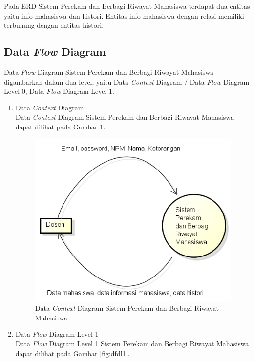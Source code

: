 Pada ERD Sistem Perekam dan Berbagi Riwayat Mahasiswa terdapat dua entitas yaitu info
mahasiswa dan histori. Entitas info mahasiswa dengan relasi memiliki terbuhung
dengan entitas histori.

\subsection{Data {\it Flow} Diagram}
Data {\it Flow} Diagram Sistem Perekam dan Berbagi Riwayat Mahasiswa digambarkan dalam dua
level, yaitu Data {\it Context} Diagram / Data {\it Flow} Diagram Level 0, Data
{\it Flow} Diagram Level 1.

\begin{enumerate}[(1)]
  \item Data {\it Context} Diagram\\
  Data {\it Context} Diagram Sistem Perekam dan Berbagi Riwayat Mahasiswa dapat dilihat pada
  Gambar \ref{fig:dcd}.
  
\begin{figure}[p]
\centering
\includegraphics[scale=1]{Gambar/datacontextdiagram.png}
\caption[Data {\it Context} Diagram Sistem Perekam dan Berbagi Riwayat Mahasiswa]{Data
{\it Context} Diagram Sistem Perekam dan Berbagi Riwayat Mahasiswa}
\label{fig:dcd}
\end{figure}
  
  \item Data {\it Flow} Diagram Level 1\\
  Data {\it Flow} Diagram Level 1 Sistem Perekam dan Berbagi Riwayat Mahasiswa dapat dilihat
  pada Gambar \ref{fig:dfdl1}.
  

\end{enumerate}
